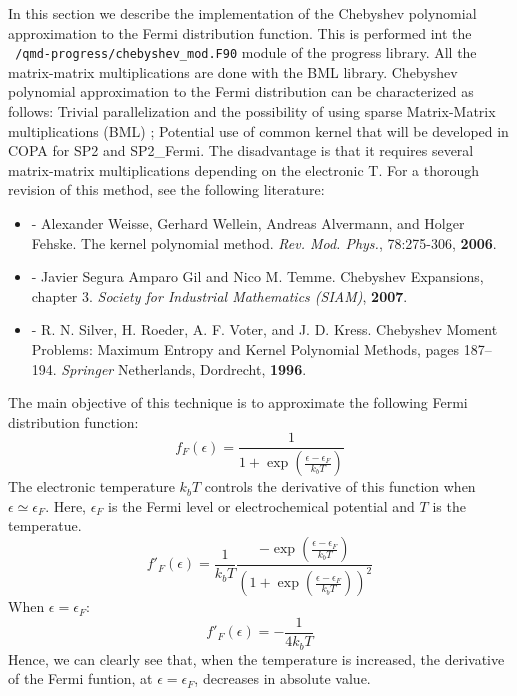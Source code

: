 
\newcommand{\coef}{\textbf{c}}  
  
In this section we describe the implementation of the Chebyshev polynomial approximation to the Fermi distribution function. 
This is performed int the \texttt{~/qmd-progress/chebyshev\_mod.F90} module of the progress library. All the matrix-matrix multiplications are done with the BML library. 
Chebyshev polynomial approximation to the Fermi distribution can be characterized as follows: Trivial parallelization and the possibility of using sparse Matrix-Matrix multiplications (BML)
; Potential use of common kernel that will be developed in COPA for SP2 and SP2\_Fermi. The disadvantage is that it requires several matrix-matrix multiplications depending on the electronic T. For a thorough revision of this method, see the following literature:  
 \begin{itemize}
    \item - Alexander Weisse, Gerhard Wellein, Andreas Alvermann, and Holger Fehske. The kernel polynomial method. \textit{Rev. Mod. Phys.}, 78:275-306, \textbf{2006}. 
    \item - Javier Segura Amparo Gil and Nico M. Temme. Chebyshev Expansions, chapter 3. \textit{Society for Industrial Mathematics (SIAM)}, \textbf{2007}.
    \item - R. N. Silver, H. Roeder, A. F. Voter, and J. D. Kress. Chebyshev Moment Problems: Maximum Entropy and Kernel Polynomial Methods, pages 187–194. \textit{Springer} Netherlands, Dordrecht, \textbf{1996}. 
 \end{itemize}  

The main objective of this technique is to approximate the following Fermi distribution function:
%
\begin{equation}
  f_F(\epsilon)= \frac{1}{1+\exp(\frac{\epsilon-\epsilon_F}{k_bT})}
  \label{Fermi}
\end{equation}
%
The electronic temperature $k_bT$ controls the derivative of this function when $\epsilon \simeq \epsilon_F$.
Here, $\epsilon_F$ is the Fermi level or electrochemical potential and $T$ is the temperatue.
%
\begin{equation}
  f'_F(\epsilon)= \frac{1}{k_bT}  
  \frac{-\exp{(\frac{\epsilon-\epsilon_F}{k_bT})}}{\left(1+\exp(\frac{\epsilon-\epsilon_F}{k_bT})\right)^2}
  \label{FermiD}
\end{equation}
%
When $\epsilon=\epsilon_F$: 
%
\begin{equation}
  f'_F(\epsilon)= -\frac{1}{4k_bT}  
  \label{FermiDEf}
\end{equation}
%
Hence, we can clearly see that, when the temperature is increased, the derivative of the Fermi funtion, at $\epsilon=\epsilon_F$, decreases in absolute value.  

